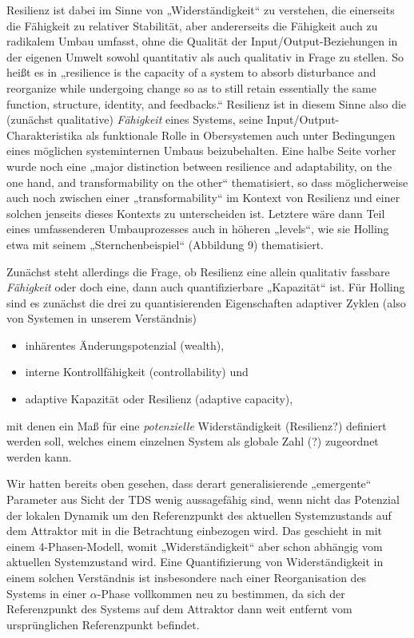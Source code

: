 \documentclass[11pt,a4paper]{article}
\begin{document}
Resilienz ist dabei im Sinne von „Widerständigkeit“ zu verstehen, die
einerseits die Fähigkeit zu relativer Stabilität, aber andererseits die
Fähigkeit auch zu radikalem Umbau umfasst, ohne die Qualität der
Input/Output-Beziehungen in der eigenen Umwelt sowohl quantitativ als auch
qualitativ in Frage zu stellen. So heißt es in \cite{Walker2004} „resilience
is the capacity of a system to absorb disturbance and reorganize while
undergoing change so as to still retain essentially the same function,
structure, identity, and feedbacks.“ Resilienz ist in diesem Sinne also die
(zunächst qualitative) \emph{Fähigkeit} eines Systems, seine
Input/Output-Charakteristika als funktionale Rolle in Obersystemen auch unter
Bedingungen eines möglichen systeminternen Umbaus beizubehalten. Eine halbe
Seite vorher wurde noch eine „major distinction between resilience and
adaptability, on the one hand, and transformability on the other“
thematisiert, so dass möglicherweise auch noch zwischen einer
„transformability“ im Kontext von Resilienz und einer solchen jenseits dieses
Kontexts zu unterscheiden ist.  Letztere wäre dann Teil eines umfassenderen
Umbauprozesses auch in höheren „levels“, wie sie Holling etwa mit seinem
„Sternchenbeispiel“ (Abbildung 9) thematisiert.

Zunächst steht allerdings die Frage, ob Resilienz eine allein qualitativ
fassbare \emph{Fähigkeit} oder doch eine, dann auch quantifizierbare
„Kapazität“ ist. Für Holling sind es zunächst die drei zu quantisierenden
Eigenschaften adaptiver Zyklen (also von Systemen in unserem Verständnis)
\begin{itemize}[noitemsep]
\item inhärentes Änderungspotenzial (wealth),
\item interne Kontrollfähigkeit (controllability) und
\item adaptive Kapazität oder Resilienz (adaptive capacity),
\end{itemize}
mit denen ein Maß für eine \emph{potenzielle} Widerständigkeit (Resilienz?)
definiert werden soll, welches einem einzelnen System als globale Zahl (?)
zugeordnet werden kann.

Wir hatten bereits oben gesehen, dass derart generalisierende „emergente“
Parameter aus Sicht der TDS wenig aussagefähig sind, wenn nicht das Potenzial
der lokalen Dynamik um den Referenzpunkt des aktuellen Systemzustands auf dem
Attraktor mit in die Betrachtung einbezogen wird. Das geschieht in
\cite{Holling2000} mit einem 4-Phasen-Modell, womit „Widerständigkeit“ aber
schon abhängig vom aktuellen Systemzustand wird. Eine Quantifizierung von
Widerständig\-keit in einem solchen Verständnis ist insbesondere nach einer
Reorganisation des Systems in einer $\alpha$-Phase vollkommen neu zu
bestimmen, da sich der Referenzpunkt des Systems auf dem Attraktor dann weit
entfernt vom ursprünglichen Referenzpunkt befindet.
\end{document}
